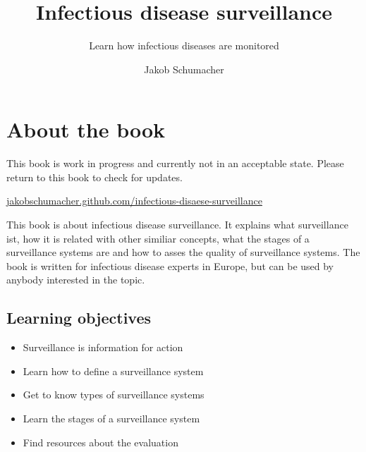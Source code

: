 \documentclass[
  letterpaper,
  DIV=11,
  numbers=noendperiod]{scrreprt}
\title{Infectious disease surveillance}
\subtitle{Learn how infectious diseases are monitored}
\author{Jakob Schumacher}
\date{}
\providecommand{\tightlist}{%
  \setlength{\itemsep}{0pt}\setlength{\parskip}{0pt}}\usepackage{longtable,booktabs,array}
\renewcommand*\contentsname{Table of contents}
\newcommand\contentsname{Table of contents}
\begin{document}
\maketitle

\renewcommand*\contentsname{Table of contents}
{
\hypersetup{linkcolor=}
\setcounter{tocdepth}{2}
\tableofcontents
}


\chapter*{About the book}\label{about-the-book}


\begin{tcolorbox}[enhanced jigsaw, opacitybacktitle=0.6, titlerule=0mm, breakable, bottomrule=.15mm, colframe=quarto-callout-warning-color-frame, toprule=.15mm, left=2mm, colbacktitle=quarto-callout-warning-color!10!white, coltitle=black, colback=white, bottomtitle=1mm, rightrule=.15mm, toptitle=1mm, title=\textcolor{quarto-callout-warning-color}{\faExclamationTriangle}\hspace{0.5em}{Warning}, opacityback=0, arc=.35mm, leftrule=.75mm]

This book is work in progress and currently not in an acceptable state.
Please return to this book to check for updates.

\href{https://jakobschumacher.github.com/infectious-disaese-surveillance}{jakobschumacher.github.com/infectious-disaese-surveillance}

\end{tcolorbox}

This book is about infectious disease surveillance. It explains what
surveillance ist, how it is related with other similiar concepts, what
the stages of a surveillance systems are and how to asses the quality of
surveillance systems. The book is written for infectious disease experts
in Europe, but can be used by anybody interested in the topic.

\section*{Learning objectives}\label{learning-objectives}


\begin{itemize}
\tightlist
\item
  Surveillance is information for action
\item
  Learn how to define a surveillance system
\item
  Get to know types of surveillance systems
\item
  Learn the stages of a surveillance system
\item
  Find resources about the evaluation
\end{itemize}
\end{document}
